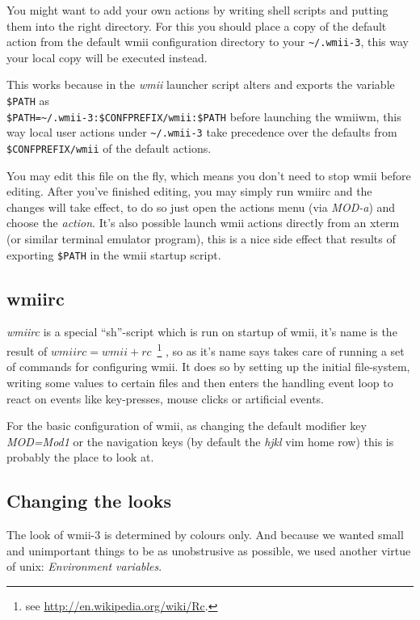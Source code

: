 \documentclass[12pt,a4paper]{article} %
\newcommand{\hrefx}[1]{\href{#1}{#1}} %
\begin{document}
    You might want to add your own actions by writing shell scripts
    and putting them into the right directory.  For this you should
    place a copy of the default action from the default wmii
    configuration directory to your \texttt{\~{}/.wmii-3}, this way
    your local copy will be executed instead.
    
    This works because in the \emph{wmii} launcher script alters and
    exports the variable \verb+$PATH+ as\\
    \verb+$PATH=~/.wmii-3:$CONFPREFIX/wmii:$PATH+ before
    launching the wmiiwm, this way local user actions under
    \verb+~/.wmii-3+ take precedence over the defaults from
    \verb+$CONFPREFIX/wmii+ of the default actions.
    
    You may edit this file on the fly, which means you don't need to
    stop wmii before editing. After you've finished editing, you may
    simply run wmiirc and the changes will take effect, to do so just
    open the actions menu (via \emph{MOD-a}) and choose the
    \emph{action}. It's also possible launch wmii actions directly
    from an xterm (or similar terminal emulator program), this is a nice
    side effect that results of exporting \verb+$PATH+ in the wmii 
    startup script.

  \subsection{wmiirc}
  
    \emph{wmiirc} is a special ``sh''-script which is run on startup
    of wmii, it's name is the result of ${}wmiirc=wmii+rc$~\footnote{
    see \hrefx{http://en.wikipedia.org/wiki/Rc}.}  , so as it's name
    says takes care of running a set of commands for configuring
    wmii. It does so by setting up the initial file-system, writing
    some values to certain files and then enters the handling event
    loop to react on events like key-presses, mouse clicks or
    artificial events.
    
    For the basic configuration of wmii, as changing the default
    modifier key \emph{MOD=Mod1} or the navigation keys (by default
    the \emph{hjkl} vim home row) this is probably the place to look
    at.

  \subsection{Changing the looks}

    The look of wmii-3 is determined by colours only. And because we
    wanted small and unimportant things to be as unobstrusive as
    possible, we used another virtue of unix: \emph{Environment
    variables}.
\end{document}
